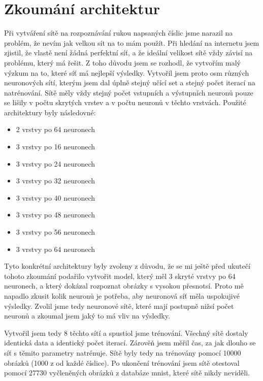 \section{Zkoumání architektur}
Při vytváření sítě na rozpoznávání rukou napsaných číslic jsme narazil na problém, že nevím jak velkou sít na to mám použít.
Při hledání na internetu jsem zjistil, že vlastě není žádná perfektní síť, a že ideální velikost sítě vždy závisí na problému, který má řešit.
Z toho důvodu jsem se rozhodl, že vytvořím malý výzkum na to, které síť má nejlepší výsledky.
Vytvořil jsem proto osm různých neuronových sítí, kterým jsem dal úplně stejný učící set a stejný počet iterací na natrénování.
Sítě měly vždy stejný počet vstupních a výstupních neuronů pouze se lišily v počtu skrytých vrstev a v počtu neuronů v těchto vrstvách.
Použité architektury byly následovné:
\begin{itemize}
    \item 2 vrstvy po 64 neuronech
    \item 3 vrstvy po 16 neuronech
    \item 3 vrstvy po 24 neuronech
    \item 3 vrstvy po 32 neuronech
    \item 3 vrstvy po 40 neuronech
    \item 3 vrstvy po 48 neuronech
    \item 3 vrstvy po 56 neuronech
    \item 3 vrstvy po 64 neuronech
\end{itemize}
Tyto konkrétní architektury byly zvoleny z důvodu, že se mi ještě před ukutečí tohoto zkoumání podařilo vytvořit model,
který měl 3 skryté vrstvy po 64 neuronech, a který dokázal rozpoznat obrázky s vysokou přesnotsí.
Proto mě napadlo zkusit kolik neuronů je potřeba, aby neuronová síť měla uspokujivé výsledky.
Zvolil jsme tedy neuronové sítě, které mají postupně nižsí počet neuronů a zkoumal jsem jaký to má vliv na výsledky.

Vytvořil jsem tedy 8 těchto sítí a spustiol jsme trénování. Všechný sítě dostaly identická data a identický počet iterací.
Zárověň jsem měřil čas, za jak dlouho se síť s těmito parametry natrénuje. Sítě byly tedy na trénovány pomocí 10000 obrázků (1000 z od každé číslice).
Po ukončení trénování jsem sítě otestoval pomocí 27730 vyčleněných obrázků z databáze mnist, které sítě nikdy neviděli.

